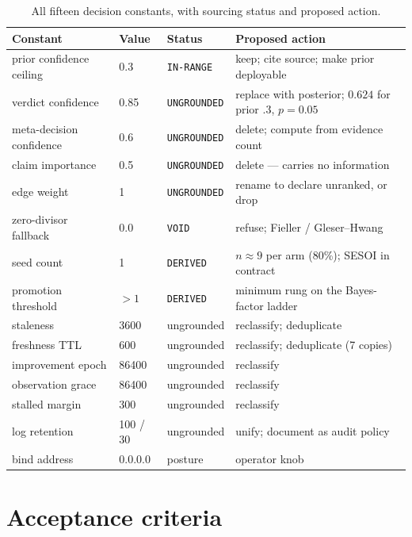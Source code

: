 \documentclass[11pt,letterpaper]{article}
\newcommand{\code}[1]{\texttt{#1}}
\begin{document}
\begin{table}[h]
\centering
\caption{All fifteen decision constants, with sourcing status and proposed
action.}
\label{tab:summary}
\small
\setlength{\tabcolsep}{3.5pt}
\begin{tabular}{@{}p{}p{}p{}p{}@{}}
\toprule
\textbf{Constant} & \textbf{Value} & \textbf{Status} & \textbf{Proposed action} \\
\midrule
prior confidence ceiling & 0.3 & \code{IN-RANGE} & keep; cite source; make prior deployable \\
verdict confidence & 0.85 & \code{UNGROUNDED} & replace with posterior; $0.624$ for prior .3, $p{=}0.05$ \\
meta-decision confidence & 0.6 & \code{UNGROUNDED} & delete; compute from evidence count \\
claim importance & 0.5 & \code{UNGROUNDED} & delete --- carries no information \\
edge weight & 1 & \code{UNGROUNDED} & rename to declare unranked, or drop \\
zero-divisor fallback & 0.0 & \code{VOID} & refuse; Fieller / Gleser--Hwang \\
seed count & 1 & \code{DERIVED} & $n \approx 9$ per arm (80\%); SESOI in contract \\
promotion threshold & $>1$ & \code{DERIVED} & minimum rung on the Bayes-factor ladder \\
staleness & 3600 & ungrounded & reclassify; deduplicate \\
freshness TTL & 600 & ungrounded & reclassify; deduplicate (7 copies) \\
improvement epoch & 86400 & ungrounded & reclassify \\
observation grace & 86400 & ungrounded & reclassify \\
stalled margin & 300 & ungrounded & reclassify \\
log retention & 100 / 30 & ungrounded & unify; document as audit policy \\
bind address & 0.0.0.0 & posture & operator knob \\
\bottomrule
\end{tabular}
\end{table}

\section{Acceptance criteria}
\end{document}
